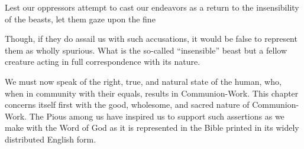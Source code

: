 Lest our oppressors attempt to cast our endeavors as a return to the insensibility of the beasts, let them gaze upon the fine

Though, if they do assail us with such accusations, it would be false to represent them as wholly spurious.
What is the so-called ``insensible'' beast but a fellow creature acting in full correspondence with its nature.

We must now speak of the right, true, and natural state of the human, who, when in community with their equals, results in Communion-Work.
This chapter concerns itself first with the good, wholesome, and sacred nature of Communion-Work.
The Pious among us have inspired us to support such assertions as we make with the Word of God as it is represented in the Bible printed in its widely distributed English form. 
